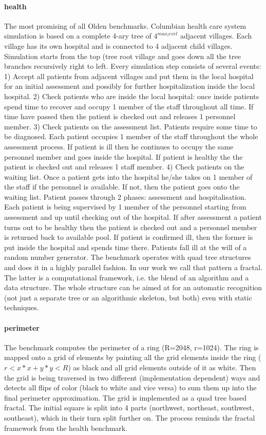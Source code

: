 \documentclass[10pt,a4paper]{report}
\begin{document}
\paragraph{health} The most promising of all Olden benchmarks. Columbian health care system simulation is based on a complete 4-ary tree of $4^{max_level}$ adjacent villages. Each village has its own hospital and is connected to 4 adjacent child villages. Simulation starts from the top (tree root village and goes down all the tree branches recursively right to left.
Every simulation step consists of several events:
1) Accept all patients from adjacent villages and put them in the local hospital for an initial assessment and possibly for further hospitalization inside the local hospital. 
2) Check patients who are inside the local hospital: once inside patients spend time to recover and occupy 1 member of the staff throughout all time. If time have passed then the patient is checked out and releases 1 personnel member.
3) Check patients on the assessment list. Patients require some time to be diagnosed. Each patient occupies 1 member of the staff throughout the whole assessment process. If patient is ill then he continues to occupy the same personnel member and goes inside the hospital. If patient is healthy the the patient is checked out and releases 1 staff member.
4) Check patients on the waiting list. Once a patient gets into the hospital he/she takes on 1 member of the staff if the personnel is
available. If not, then the patient goes onto the waiting list. Patient passes through 2 phases: assessment and hospitalisation. Each patient is being supervised by 1 member of the personnel starting from assessment and up until checking out of the hospital. If after assessment a patient turns out to be healthy then the patient is checked out and a personnel member is returned back to available pool. If patient is confirmed ill, then the former is put inside the hospital and spends time there. Patients fall ill at the will of a random number generator. 
\quad The benchmark operates with quad tree structures and does it in a highly parallel fashion. In our work we call that pattern a fractal. The latter is a computational framework, i.e. the blend of an algorithm and a data structure. The whole structure can be aimed at for an automatic recognition (not just a separate tree or an algorithmic skeleton, but both) even with static techniques.

\paragraph{perimeter} The benchmark computes the perimeter of a ring (R=2048, r=1024). The ring is mapped onto a grid of elements by painting all the grid elements inside the ring ($r \lt x*x+y*y \lt R$) as black and all grid elements outside of it as white. Then the grid is being traversed in two different (implementation dependent) ways and detects all flips of color (black to white and vice versa) to sum them up into the final perimeter approximation. The grid is implemented as a quad tree based fractal. The initial square is split into 4 parts (northwest, northeast, southwest, southeast), which in their turn split further on. The process reminds the fractal framework from the health benchmark.  
\end{document}
